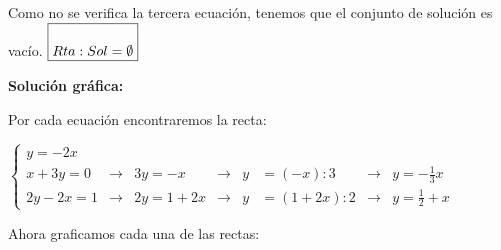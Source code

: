 \documentclass[11pt]{article}
\begin{document}
\begin{enumerate}[\hspace{-5mm} 1) ]
\begin{enumerate}[a)]
\begin{enumerate}[a)]
\begin{enumerate}[i)]
\begin{itemize}
\end{itemize}



Como no se verifica la tercera ecuación, tenemos que el conjunto de solución es vacío. \hfill   $\boxed{\rule{0mm}{7mm}  Rta:   Sol=\emptyset }$


\bigskip 

{\bf Solución gráfica:}


Por cada ecuación  encontraremos la recta:
\bigskip

\hspace{-4mm}
$\left\{ \begin{array}{lcccrlccl} 
\boxed{ y= -2x }&   
\\[4mm]%
x + 3y = 0   &\longrightarrow&    3y = -x & \longrightarrow & y &= (-x): 3 & \longrightarrow & \boxed{y =  - \tfrac{1}{3} x }
\\[4mm]%
 2y - 2x = 1 &\longrightarrow&   2y = 1 +2x & \longrightarrow & y &= (1 +2x):2 & \longrightarrow &\boxed{ y = \frac{1}{2}+x}
\end{array}\right. $
 


         
       

\bigskip 

Ahora graficamos cada una de las rectas:



\begin{minipage}{.45\textwidth}


\begin{center}
    



 
\end{center}
\end{minipage}
\end{enumerate}
\end{enumerate}
\end{enumerate}
\end{enumerate}
\end{document}
